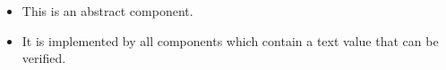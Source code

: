 \begin{itemize}
\item This is an abstract component.
\item It is implemented by all components which contain a text value that can be verified.
\end{itemize}

